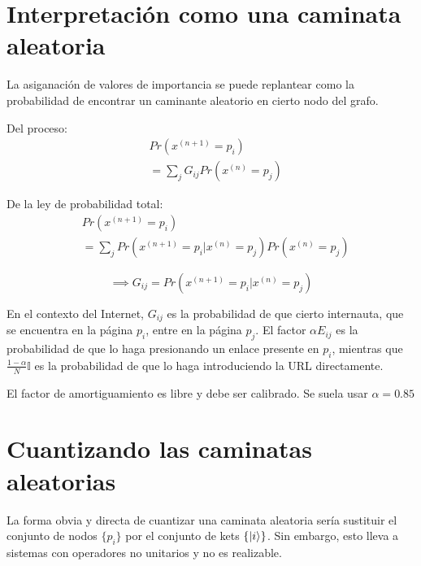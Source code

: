 \section{Interpretación como una caminata aleatoria}

La asiganación de valores de importancia se puede replantear como la probabilidad de encontrar un caminante aleatorio en cierto nodo del grafo.

\begin{minipage}{0.5\linewidth}
Del proceso:
\begin{align*}
& Pr(x^{(n+1)}=p_i) \\
& =\sum\limits_j G_{i j} Pr(x^{(n)}=p_j)
\end{align*}
\end{minipage}
\begin{minipage}{0.5\linewidth}
De la ley de probabilidad total:
\begin{align*}
& Pr(x^{(n+1)}=p_i) \\
& =\sum\limits_j Pr(x^{(n+1)}=p_i|x^{(n)}=p_j) Pr(x^{(n)}=p_j)
\end{align*}
\end{minipage}
\[
\implies G_{i j} = Pr(x^{(n+1)}=p_i | x^{(n)}=p_j)
\]

En el contexto del Internet, $G_{i j}$ es la probabilidad de que cierto internauta, que se encuentra en la página $p_i$, entre en la página $p_j$. El factor $\alpha E_{i j}$ es la probabilidad de que lo haga presionando un enlace presente en $p_i$, mientras que $\frac{1-\alpha}{N} \mathds{I}$ es la probabilidad de que lo haga introduciendo la URL directamente.

El factor de amortiguamiento es libre y debe ser calibrado. Se suela usar $\alpha = 0.85$

\section{Cuantizando las caminatas aleatorias}

La forma obvia y directa de cuantizar una caminata aleatoria sería sustituir el conjunto de nodos $\{p_i\}$ por el conjunto de kets $\{\ket{i}\}$. Sin embargo, esto lleva a sistemas con operadores no unitarios y no es realizable.

